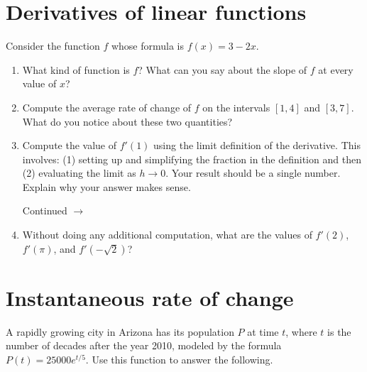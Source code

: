 \documentclass[11pt]{article}
\def\ra{\rightarrow}
\def\pageturn{\vfill 
\begin{flushright}
	\begin{small}
		Continued $\ra$
	\end{small}
\end{flushright} \newpage}
\begin{document}
\section{Derivatives of linear functions}

Consider the function $f$ whose formula is $f(x) = 3 - 2x$. 

\begin{enumerate}
	\item What kind of function is $f$? What can you say about the slope of $f$ at every value of $x$? 
	
	\vspace{0.5in}
	
	\item Compute the average rate of change of $f$ on the intervals $[1,4]$ and $[3,7]$. What do you notice about these two quantities? 
	
	\vspace{1in}
	
	\item Compute the value of $f'(1)$ using the limit definition of the derivative. This involves: (1) setting up and simplifying the fraction in the definition and then (2) evaluating the limit as $h \to 0$. Your result should be a single number. Explain why your answer makes sense. 
	
	\pageturn
	
	\item Without doing any additional computation, what are the values of $f'(2)$, $f'(\pi)$, and $f'(-\sqrt{2})$? 
\end{enumerate}


\section{Instantaneous rate of change}

A rapidly growing city in Arizona has its population $P$ at time $t$, where $t$ is the number of decades after the year 2010, modeled by the formula $P(t) = 25000e^{t/5}$. Use this function to answer the following. 
\end{document}

